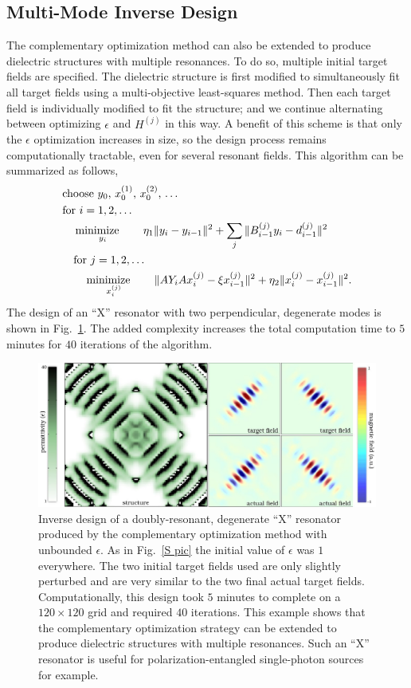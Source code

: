 \subsection{Multi-Mode Inverse Design}
The complementary optimization method can also be extended to produce dielectric structures with multiple resonances. To do so, multiple initial target fields are specified. The dielectric structure is first modified to simultaneously fit all target fields using a multi-objective least-squares method. Then each target field is individually modified to fit the structure; and we continue alternating between optimizing $\epsilon$ and $H^{(j)}$ in this way. A benefit of this scheme is that only the $\epsilon$ optimization increases in size, so the design process remains computationally tractable, even for several resonant fields. This algorithm can be summarized as follows,
\begin{align}
&\text{choose $y_0$, $x^{(1)}_0$, $x^{(2)}_0$, \ldots} \nonumber \\
&\text{for } i = 1, 2, \ldots \nonumber \\
&\quad\operatorname*{\text{minimize}\quad}_{y_i}\quad \eta_1\|y_i-y_{i-1}\|^2 + \sum_j \|B^{(j)}_{i-1} y_i-d^{(j)}_{i-1}\|^2  \label{mm1}\\
&\quad\text{for } j = 1, 2, \ldots \nonumber \\
&\quad\quad\operatorname*{\text{minimize}\quad}_{x^{(j)}_i}\quad \|A Y_i A x^{(j)}_i - \xi x^{(j)}_{i-1}\|^2 + \eta_2\|x^{(j)}_i-x^{(j)}_{i-1}\|^2. \label{mm2}
\end{align}
The design of an ``X'' resonator with two perpendicular, degenerate modes is shown in Fig.~\ref{X pic}. The added complexity increases the total computation time to $5$ minutes for $40$ iterations of the algorithm. 
\begin{figure}\centering
\includegraphics[width=\textwidth]{p1/X}
\caption{Inverse design of a doubly-resonant, degenerate ``X'' resonator produced by the complementary optimization method with unbounded $\epsilon$. As in Fig.~\ref{S pic} the initial value of $\epsilon$ was $1$ everywhere. The two initial target fields used are only slightly perturbed and are very similar to the two final actual target fields. Computationally, this design took $5$ minutes to complete on a $120\times 120$ grid and required $40$ iterations. This example shows that the complementary optimization strategy can be extended to produce dielectric structures with multiple resonances. Such an ``X'' resonator is useful for polarization-entangled single-photon sources for example\cite{Hen06}.}
\label{X pic}
\end{figure}

